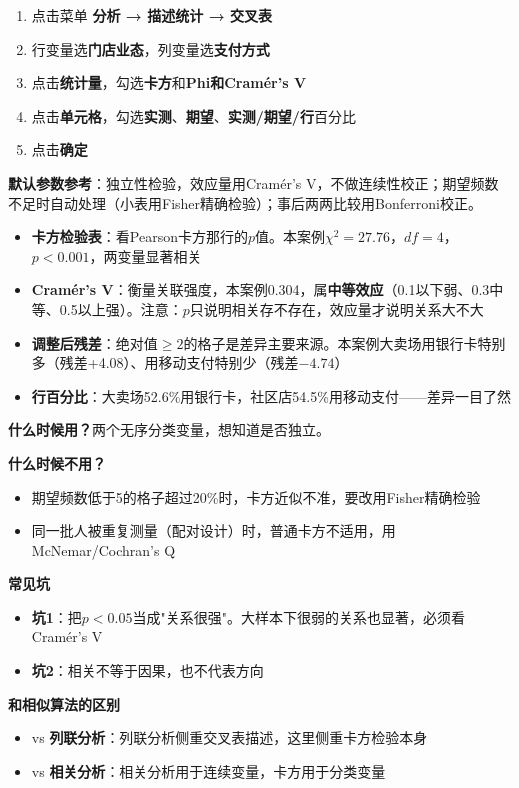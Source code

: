 \begin{algosposs}
\begin{enumerate}
    \item 点击菜单 \textbf{分析 → 描述统计 → 交叉表}
    \item 行变量选\textbf{门店业态}，列变量选\textbf{支付方式}
    \item 点击\textbf{统计量}，勾选\textbf{卡方}和\textbf{Phi和Cramér's V}
    \item 点击\textbf{单元格}，勾选\textbf{实测}、\textbf{期望}、\textbf{实测/期望/行}百分比
    \item 点击\textbf{确定}
\end{enumerate}

\textbf{默认参数参考}：独立性检验，效应量用Cramér's V，不做连续性校正；期望频数不足时自动处理（小表用Fisher精确检验）；事后两两比较用Bonferroni校正。
\end{algosposs}

\begin{algoresult}
\begin{itemize}
    \item \textbf{卡方检验表}：看Pearson卡方那行的$p$值。本案例$\chi^2=27.76$，$df=4$，$p<0.001$，两变量显著相关
    \item \textbf{Cramér's V}：衡量关联强度，本案例0.304，属\textbf{中等效应}（0.1以下弱、0.3中等、0.5以上强）。注意：$p$只说明相关存不存在，效应量才说明关系大不大
    \item \textbf{调整后残差}：绝对值$\geq 2$的格子是差异主要来源。本案例大卖场用银行卡特别多（残差+4.08）、用移动支付特别少（残差$-4.74$）
    \item \textbf{行百分比}：大卖场52.6\%用银行卡，社区店54.5\%用移动支付——差异一目了然
\end{itemize}
\end{algoresult}

\begin{algonotes}
\textbf{什么时候用？}两个无序分类变量，想知道是否独立。

\textbf{什么时候不用？}
\begin{itemize}
    \item 期望频数低于5的格子超过20\%时，卡方近似不准，要改用Fisher精确检验
    \item 同一批人被重复测量（配对设计）时，普通卡方不适用，用McNemar/Cochran's Q
\end{itemize}

\textbf{常见坑}
\begin{itemize}
    \item \textbf{坑1}：把$p<0.05$当成"关系很强"。大样本下很弱的关系也显著，必须看Cramér's V
    \item \textbf{坑2}：相关不等于因果，也不代表方向
\end{itemize}

\textbf{和相似算法的区别}
\begin{itemize}
    \item vs \textbf{列联分析}：列联分析侧重交叉表描述，这里侧重卡方检验本身
    \item vs \textbf{相关分析}：相关分析用于连续变量，卡方用于分类变量
\end{itemize}
\end{algonotes}

